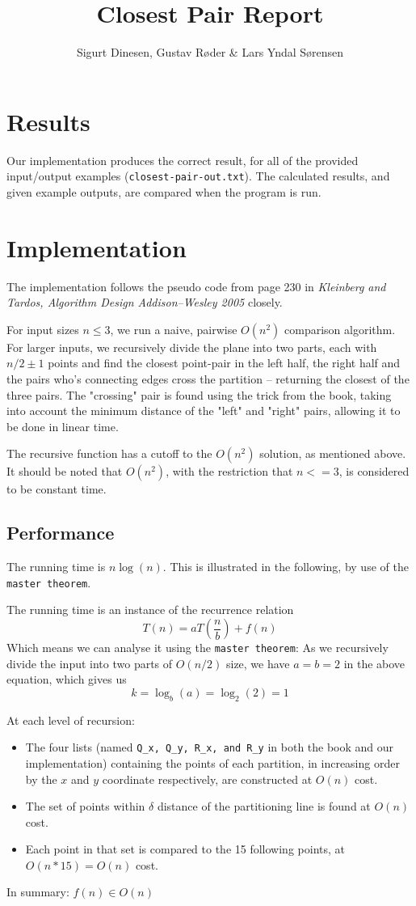 \documentclass{tufte-handout}
\title{Closest Pair Report}
\author{Sigurt Dinesen, Gustav Røder \& Lars Yndal Sørensen}
\begin{document}
\maketitle

\section{Results}
Our implementation
produces the correct result, for all of the provided input/output examples
(\texttt{closest-pair-out.txt}). The calculated results, and given
example outputs, are compared when the program is run.

\section{Implementation}
The implementation follows the pseudo code from page 230 in \emph{Kleinberg and
Tardos, Algorithm Design Addison--Wesley 2005} closely.

For input sizes $n \leq 3$, we run a naive, pairwise $O(n^2)$ comparison algorithm.
For larger inputs, we recursively divide the plane into two parts, each with
$n/2 \pm 1$ points and find the closest point-pair in the left half, the right
half and the pairs who's connecting edges cross the partition -- returning the
closest of the three pairs.
The "crossing" pair is found using the trick from the book, taking into account
the minimum distance of the "left" and "right" pairs, allowing it to be done in
linear time.

The recursive function has a cutoff to the $O(n^2)$ solution, as mentioned
above.
It should be noted that $O(n^2)$, with the restriction that $n<=3$, is
considered to be constant time.

\subsection{Performance}
The running time is $n \log(n)$. This is illustrated in the following, by use of
the \texttt{master theorem}.

The running time is an instance of the recurrence relation
$$T(n) = a T\left(\frac{n}{b}\right) + f\left(n\right)$$
Which means we can analyse it using the \texttt{master theorem}:
As we recursively divide the input into two parts of $O(n/2)$ size, we have
$a=b=2$ in the above equation, which gives us
$$k = \log_b(a) = \log_2(2) = 1$$

At each level of recursion:
\begin{itemize}
	\item The four lists (named \texttt{Q\_x, Q\_y, R\_x, and R\_y} in both
		the book and our implementation) containing the points of each
		partition, in increasing order by the $x$ and $y$ coordinate
		respectively, are constructed at $O(n)$ cost.

	\item The set of points within $\delta$ distance of the partitioning
		line is found at $O(n)$ cost.

	\item Each point in that set is compared to the 15 following points, at
		$O(n*15) = O(n)$ cost.
\end{itemize}
In summary: $f\left(n\right) \in O(n)$
\end{document}
